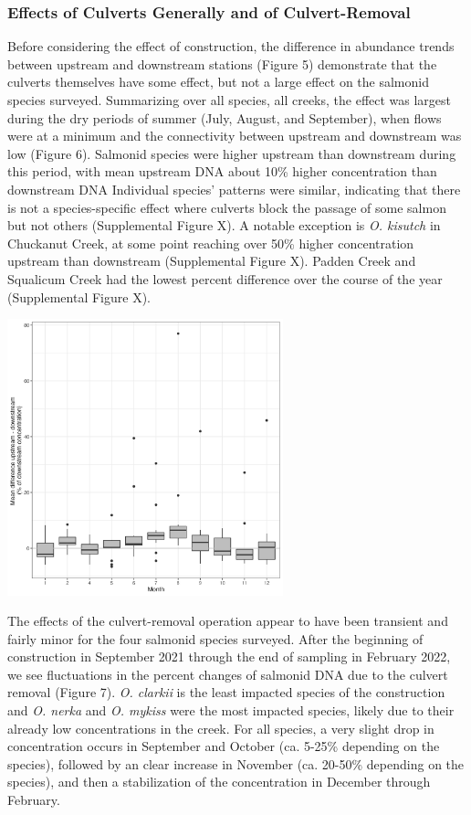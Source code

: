 \documentclass[
]{article}
\begin{document}
\hypertarget{effects-of-culverts-generally-and-of-culvert-removal}{%
\subsubsection{Effects of Culverts Generally and of
Culvert-Removal}\label{effects-of-culverts-generally-and-of-culvert-removal}}

Before considering the effect of construction, the difference in
abundance trends between upstream and downstream stations (Figure 5)
demonstrate that the culverts themselves have some effect, but not a
large effect on the salmonid species surveyed. Summarizing over all
species, all creeks, the effect was largest during the dry periods of
summer (July, August, and September), when flows were at a minimum and
the connectivity between upstream and downstream was low (Figure 6).
Salmonid species were higher upstream than downstream during this
period, with mean upstream DNA about 10\% higher concentration than
downstream DNA Individual species' patterns were similar, indicating
that there is not a species-specific effect where culverts block the
passage of some salmon but not others (Supplemental Figure X). A notable
exception is \emph{O. kisutch} in Chuckanut Creek, at some point
reaching over 50\% higher concentration upstream than downstream
(Supplemental Figure X). Padden Creek and Squalicum Creek had the lowest
percent difference over the course of the year (Supplemental Figure X).

\includegraphics[width=0.6\textwidth,height=\textheight]{../Output/Figures/20221123_culvert_effect_flowcorrected.png}

The effects of the culvert-removal operation appear to have been
transient and fairly minor for the four salmonid species surveyed. After
the beginning of construction in September 2021 through the end of
sampling in February 2022, we see fluctuations in the percent changes of
salmonid DNA due to the culvert removal (Figure 7). \emph{O. clarkii} is
the least impacted species of the construction and \emph{O. nerka} and
\emph{O. mykiss} were the most impacted species, likely due to their
already low concentrations in the creek. For all species, a very slight
drop in concentration occurs in September and October (ca. 5-25\%
depending on the species), followed by an clear increase in November
(ca. 20-50\% depending on the species), and then a stabilization of the
concentration in December through February.
\end{document}
